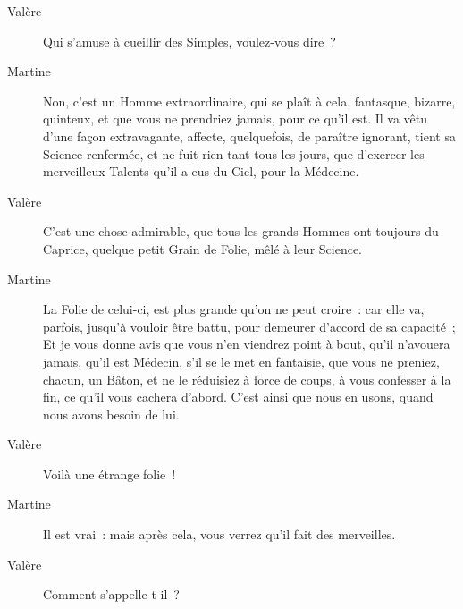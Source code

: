 \documentclass[french,twoside]{book} %
\begin{document}
 \begin{description} \item[Valère] 

Qui s’amuse à cueillir des Simples, voulez-vous dire ?\end{description}
 \begin{description} \item[Martine] 

Non, c’est un Homme extraordinaire, qui se plaît à cela, fantasque, bizarre, quinteux, et que vous ne prendriez jamais, pour ce qu’il est. Il va vêtu d’une façon extravagante, affecte, quelquefois, de paraître ignorant, tient sa Science renfermée, et ne fuit rien tant tous les jours, que d’exercer les merveilleux Talents qu’il a eus du Ciel, pour la Médecine.\end{description}
 \begin{description} \item[Valère] 

C’est une chose admirable, que tous les grands Hommes ont toujours du Caprice, quelque petit Grain de Folie, mêlé à leur Science.\end{description}
 \begin{description} \item[Martine] 

La Folie de celui-ci, est plus grande qu’on ne peut croire : car elle va, parfois, jusqu’à vouloir être battu, pour demeurer d’accord de sa capacité ; Et je vous donne avis que vous n’en viendrez point à bout, qu’il n’avouera jamais, qu’il est Médecin, s’il se le met en fantaisie, que vous ne preniez, chacun, un Bâton, et ne le réduisiez à force de coups, à vous confesser à la fin, ce qu’il vous cachera d’abord. C’est ainsi que nous en usons, quand nous avons besoin de lui.\end{description}
 \begin{description} \item[Valère] 

Voilà une étrange folie !\end{description}
 \begin{description} \item[Martine] 

Il est vrai : mais après cela, vous verrez qu’il fait des merveilles.\end{description}
 \begin{description} \item[Valère] 

Comment s’appelle-t-il ?\end{description}
\end{document}
